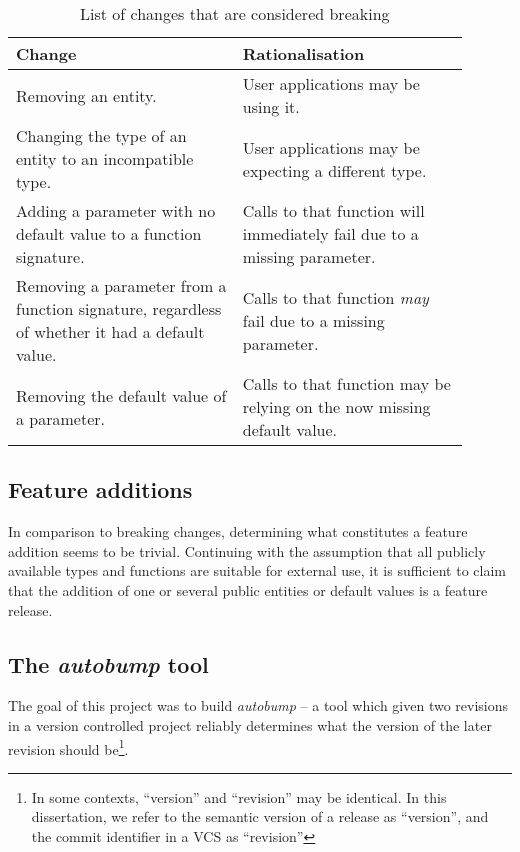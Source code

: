 \documentclass{l4proj}
\begin{document}
\begin{table}[H]
\centering
\begin{tabular}{|p{0.45\linewidth}|p{0.45\linewidth}|}
\hline
\textbf{Change}                                                                               & \textbf{Rationalisation}                                                 \\
\hline
Removing an entity.                                                                           & User applications may be using it.                                       \\
\hline
Changing the type of an entity to an incompatible type.                                       & User applications may be expecting a different type.                     \\
\hline
Adding a parameter with no default value to a function signature.                             & Calls to that function will immediately fail due to a missing parameter. \\
\hline
Removing a parameter from a function signature, regardless of whether it had a default value. & Calls to that function \textit{may} fail due to a missing parameter.     \\
\hline
Removing the default value of a parameter.                                                    & Calls to that function may be relying on the now missing default value.  \\
\hline
\end{tabular}
\caption{List of changes that are considered breaking}
\end{table}

\subsection{Feature additions}

In comparison to breaking changes, determining what constitutes a
feature addition seems to be trivial. Continuing with the assumption
that all publicly available types and functions are suitable for
external use, it is sufficient to claim that the addition of one or
several public entities or default values is a feature release.

\subsection{The \textit{autobump} tool}

The goal of this project was to build \textit{autobump} -- a tool which
given two revisions in a version controlled project reliably
determines what the version of the later revision should
be\footnote{In some contexts, ``version'' and ``revision'' may be
identical. In this dissertation, we refer to the semantic version of a
release as ``version'', and the commit identifier in a VCS as ``revision''}.
\end{document}
